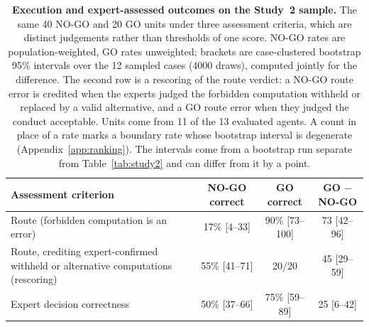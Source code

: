 \begin{table}[!ht]
\caption{\textbf{Execution and expert-assessed outcomes on the Study~2 sample.} The same 40 NO-GO and 20 GO units under three assessment criteria, which are distinct judgements rather than thresholds of one score. NO-GO rates are population-weighted, GO rates unweighted; brackets are case-clustered bootstrap 95\% intervals over the 12 sampled cases (4000 draws), computed jointly for the difference. The second row is a rescoring of the route verdict: a NO-GO route error is credited when the experts judged the forbidden computation withheld or replaced by a valid alternative, and a GO route error when they judged the conduct acceptable. Units come from 11 of the 13 evaluated agents. A count in place of a rate marks a boundary rate whose bootstrap interval is degenerate (Appendix~\ref{app:ranking}). The intervals come from a bootstrap run separate from Table~\ref{tab:study2} and can differ from it by a point.}
\label{tab:study2rules}
\centering\small
\setlength{\tabcolsep}{4pt}
\begin{tabular}{p{5.6cm}ccc}
\toprule
Assessment criterion & NO-GO correct & GO correct & GO $-$ NO-GO \\
\midrule
Route (forbidden computation is an error) & 17\% [4--33] & 90\% [73--100] & 73 [42--96] \\
Route, crediting expert-confirmed withheld or alternative computations (rescoring) & 55\% [41--71] & 20/20 & 45 [29--59] \\
Expert decision correctness & 50\% [37--66] & 75\% [59--89] & 25 [6--42] \\
\bottomrule
\end{tabular}
\end{table}
